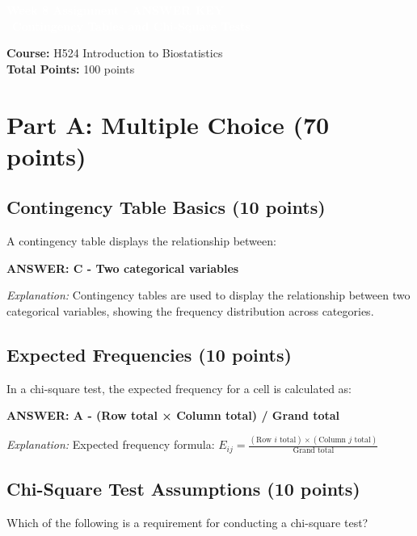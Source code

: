 \documentclass[11pt]{article}
\title{}
\author{}
\date{}
\begin{document}
\begin{tcolorbox}[colback=osaorange,colframe=black,boxrule=2pt,arc=0pt,left=6pt,right=6pt,top=10pt,bottom=10pt]
\centering
\textcolor{white}{\textbf{\Large Week 8 Assignment - ANSWER KEY}}\\\
\textcolor{white}{\textbf{\large Contingency Tables and Chi-Square Tests}}
\end{tcolorbox}

\vspace{8pt}

\noindent\textbf{Course:} H524 Introduction to Biostatistics\\
\textbf{Total Points:} 100 points

\vspace{8pt}

\section{Part A: Multiple Choice (70 points)}

\subsection*{Contingency Table Basics (10 points)}
A contingency table displays the relationship between:

\textbf{ANSWER: C - Two categorical variables}

\textit{Explanation:} Contingency tables are used to display the relationship between two categorical variables, showing the frequency distribution across categories.

\vspace{0.5cm}

\subsection*{Expected Frequencies (10 points)}
In a chi-square test, the expected frequency for a cell is calculated as:

\textbf{ANSWER: A - (Row total × Column total) / Grand total}

\textit{Explanation:} Expected frequency formula: $E_{ij} = \frac{(\text{Row } i \text{ total}) \times (\text{Column } j \text{ total})}{\text{Grand total}}$

\vspace{0.5cm}

\subsection*{Chi-Square Test Assumptions (10 points)}
Which of the following is a requirement for conducting a chi-square test?
\end{document}
